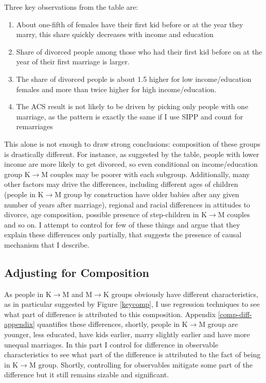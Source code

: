 \documentclass[12pt,letter]{article}
\begin{document}
Three key observations from the table are:
\begin{enumerate}
\item About one-fifth of females have their first kid before or at the year they marry, this share quickly decreases with income and education
\item Share of divorced people among those who had their first kid before on at the year of their first marriage is larger.
\item The share of divorced people is about 1.5 higher for low income/education females and more than twice higher for high income/education.
\item The ACS result is not likely to be driven by picking only people with one marriage, as the pattern is exactly the same if I use SIPP and count for remarriages
\end{enumerate}

This alone is not enough to draw strong conclusions: composition of these groups is drastically different. For instance, as suggested by the table, people with lower income are more likely to get divorced, so even conditional on income/education group K$\to$M couples may be poorer with each subgroup. Additionally, many other factors may drive the differences, including different ages of children (people in K$\to$M group by construction have older babies after any given number of years after marriage), regional and racial differences in attitudes to divorce, age composition, possible presence of step-children in K$\to$M couples and so on. I attempt to control for few of these things and argue that they explain these differences only partially, that suggests the presence of causal mechanism that I describe.

\subsection{Adjusting for Composition\label{adcomp}}
As people in K$\to$M and M$\to$K groups obviously have different characteristics, as in particular suggested by Figure \ref{keycomp}, I use regression techniques to see what part of difference is attributed to this composition. Appendix \ref{comp-diff-appendix} quantifies these differences, shortly, people in K$\to$M group are younger, less educated, have kids earlier, marry slightly earlier and have more unequal marriages. In this part I control for difference in observable characteristics to see what part of the difference is attributed to the fact of being in K$\to$M group. Shortly, controlling for observables mitigate some part of the difference but it still remains sizable and significant.
\end{document}
